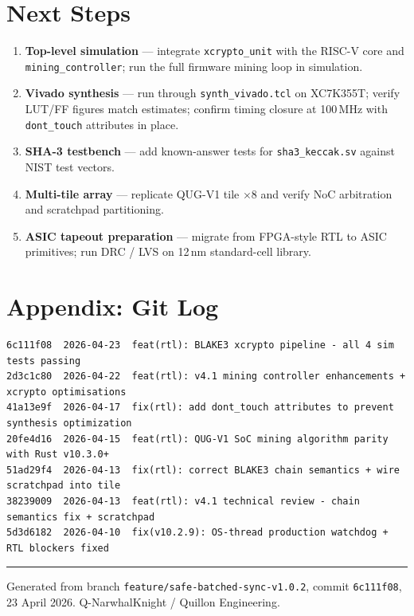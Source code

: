 \documentclass[11pt,a4paper]{article}
\begin{document}
\section{Next Steps}

\begin{enumerate}
  \item \textbf{Top-level simulation} --- integrate \texttt{xcrypto\_unit} with the
    RISC-V core and \texttt{mining\_controller}; run the full firmware mining
    loop in simulation.
  \item \textbf{Vivado synthesis} --- run through \texttt{synth\_vivado.tcl} on
    XC7K355T; verify LUT/FF figures match estimates; confirm timing closure
    at 100\,MHz with \texttt{dont\_touch} attributes in place.
  \item \textbf{SHA-3 testbench} --- add known-answer tests for \texttt{sha3\_keccak.sv}
    against NIST test vectors.
  \item \textbf{Multi-tile array} --- replicate QUG-V1 tile $\times$8 and verify
    NoC arbitration and scratchpad partitioning.
  \item \textbf{ASIC tapeout preparation} --- migrate from FPGA-style RTL to
    ASIC primitives; run DRC / LVS on 12\,nm standard-cell library.
\end{enumerate}

\section*{Appendix: Git Log}

\begin{small}
\begin{verbatim}
6c111f08  2026-04-23  feat(rtl): BLAKE3 xcrypto pipeline - all 4 sim tests passing
2d3c1c80  2026-04-22  feat(rtl): v4.1 mining controller enhancements + xcrypto optimisations
41a13e9f  2026-04-17  fix(rtl): add dont_touch attributes to prevent synthesis optimization
20fe4d16  2026-04-15  feat(rtl): QUG-V1 SoC mining algorithm parity with Rust v10.3.0+
51ad29f4  2026-04-13  fix(rtl): correct BLAKE3 chain semantics + wire scratchpad into tile
38239009  2026-04-13  feat(rtl): v4.1 technical review - chain semantics fix + scratchpad
5d3d6182  2026-04-10  fix(v10.2.9): OS-thread production watchdog + RTL blockers fixed
\end{verbatim}
\end{small}

\vspace{1cm}
\hrule
\vspace{0.3cm}
{\small\color{codegray}
Generated from branch \texttt{feature/safe-batched-sync-v1.0.2},
commit \texttt{6c111f08}, 23 April 2026.
Q-NarwhalKnight / Quillon Engineering.
}
\end{document}
